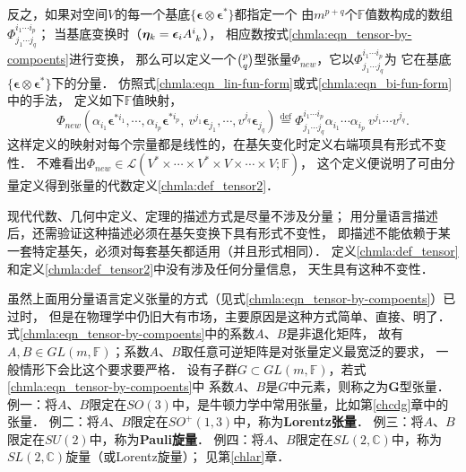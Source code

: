 反之，如果对空间$V$的每一个基底$\{\boldsymbol{\epsilon}\otimes\boldsymbol{\epsilon}^{*}\}$都指定一个
由$m^{p+q}$个$\mathbb{F}$值数构成的数组$\Phi^{i_1 \cdots i_p} _{j_1 \cdots j_q}$；
当基底变换时（$\boldsymbol{\eta}_k = \boldsymbol{\epsilon}_i A_{\hphantom{i} k} ^i$），
相应数按式\eqref{chmla:eqn_tensor-by-compoents}进行变换，
那么可以定义一个$\binom{p}{q}$型张量$\Phi_{new}$，它以$\Phi^{i_1 \cdots i_p} _{j_1 \cdots j_q}$为
它在基底$\{\boldsymbol{\epsilon}\otimes\boldsymbol{\epsilon}^{*}\}$下的分量．
仿照式\eqref{chmla:eqn_lin-fun-form}或式\eqref{chmla:eqn_bi-fun-form}中的手法，
定义如下$\mathbb{F}$值映射，
\begin{equation*}
    \Phi_{new}\left(\alpha_{i_1}\boldsymbol{\epsilon}^{*i_1},\cdots,
      \alpha_{i_p}\boldsymbol{\epsilon}^{*i_p},\
      v^{j_1}\boldsymbol{\epsilon}_{j_1},\cdots,
      v^{j_q}\boldsymbol{\epsilon}_{j_q} \right)
      \overset{\mathrm {def}}{=} \Phi^{i_1 \cdots i_p} _{j_1 \cdots j_q}
      \alpha_{i_1}\cdots\alpha_{i_p}\ v^{j_1}\cdots v^{j_q} .
\end{equation*}
这样定义的映射对每个宗量都是线性的，在基矢变化时定义右端项具有形式不变性．
不难看出$\Phi_{new}\in \mathscr{L}(V^* \times \cdots \times V^*
\times V\times \cdots \times V;\mathbb{F})$，
这个定义便说明了可由分量定义得到张量的代数定义\ref{chmla:def_tensor2}．

现代代数、几何中定义、定理的描述方式是尽量不涉及分量；
用分量语言描述后，还需验证这种描述必须在基矢变换下具有形式不变性，
即描述不能依赖于某一套特定基矢，必须对每套基矢都适用（并且形式相同）．
定义\ref{chmla:def_tensor}和定义\ref{chmla:def_tensor2}中没有涉及任何分量信息，
天生具有这种不变性．

虽然上面用分量语言定义张量的方式（见式\eqref{chmla:eqn_tensor-by-compoents}）已过时，
但是在物理学中仍旧大有市场，主要原因是这种方式简单、直接、明了．
式\eqref{chmla:eqn_tensor-by-compoents}中的系数$A$、$B$是非退化矩阵，
故有$A,B\in GL(m,\mathbb{F})$；系数$A$、$B$取任意可逆矩阵是对张量定义最宽泛的要求，
一般情形下会比这个要求要严格．
设有子群$G\subset GL(m,\mathbb{F})$，若式\eqref{chmla:eqn_tensor-by-compoents}中
系数$A$、$B$是$G$中元素，则称之为{\heiti $\boldsymbol{G}$型张量．}
{\kaishu 例一}：将$A$、$B$限定在$SO(3)$中，是牛顿力学中常用张量，比如第\ref{chcdg}章中的张量．
{\kaishu 例二}：将$A$、$B$限定在$SO^{+}(1,3)$中，称为{\heiti \bfseries Lorentz张量}．
{\kaishu 例三}：将$A$、$B$限定在$SU(2)$中，称为{\heiti \bfseries Pauli旋量}．
{\kaishu 例四}：将$A$、$B$限定在$SL(2,\mathbb{C})$中，称为$SL(2,\mathbb{C})${\heiti 旋量}（或Lorentz旋量）；
见第\ref{chlar}章．

